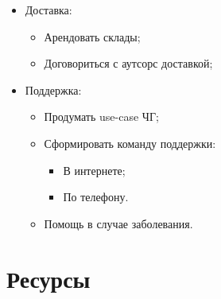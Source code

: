 \documentclass[a4paper,8pt]{article}
\begin{document}
\begin{itemize}
        \item Доставка:
            \begin{itemize}
                \item Арендовать склады;
                \item Договориться с аутсорс доставкой;
            \end{itemize}

        \item Поддержка:
            \begin{itemize}
                \item Продумать use-case ЧГ;
                \item Сформировать команду поддержки:
                    \begin{itemize}
                        \item В интернете;
                        \item По телефону.
                    \end{itemize}
                \item Помощь в случае заболевания.
            \end{itemize}
    \end{itemize}


\section*{Ресурсы}
\end{document}
